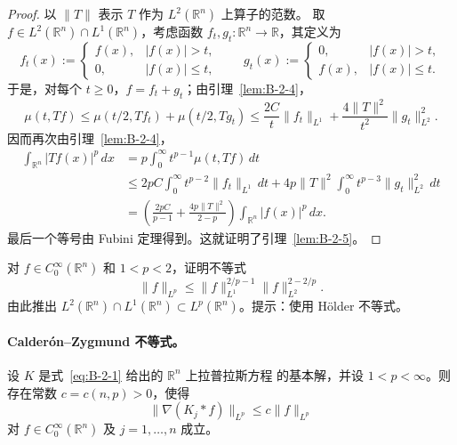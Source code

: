 \begin{proof}
以 $\|T\|$ 表示 $T$ 作为 $L^2(\mathbb R^n)$ 上算子的范数。
取 $f\in L^2(\mathbb R^n)\cap L^1(\mathbb R^n)$，考虑函数
$f_t,g_t:\mathbb R^n\to\mathbb R$，其定义为
\[
  f_t(x):=\begin{cases}
    f(x),&|f(x)|>t,\\ 0,&|f(x)|\le t,
  \end{cases}
  \qquad
  g_t(x):=\begin{cases}
    0,&|f(x)|>t,\\ f(x),&|f(x)|\le t.
  \end{cases}
\]
于是，对每个 $t\ge0$，$f=f_t+g_t$；由引理~\ref{lem:B-2-4}，
\[
  \mu(t,Tf)
  \le\mu(t/2,Tf_t)+\mu(t/2,Tg_t)
  \le\frac{2C}{t}\|f_t\|_{L^1}
     +\frac{4\|T\|^2}{t^2}\|g_t\|_{L^2}^2.
\]
因而再次由引理~\ref{lem:B-2-4}，
\begin{align*}
  \int_{\mathbb R^n}|Tf(x)|^p\,dx
  &=p\int_0^\infty t^{p-1}\mu(t,Tf)\,dt\\
  &\le2pC\int_0^\infty t^{p-2}\|f_t\|_{L^1}\,dt
   +4p\|T\|^2\int_0^\infty t^{p-3}\|g_t\|_{L^2}^2\,dt\\
  &=\left(\frac{2pC}{p-1}+\frac{4p\|T\|^2}{2-p}\right)
    \int_{\mathbb R^n}|f(x)|^p\,dx.
\end{align*}
最后一个等号由 Fubini 定理得到。这就证明了引理~\ref{lem:B-2-5}。
\end{proof}

\begin{exercise}\label{ex:B-2-6}
对 $f\in C_0^\infty(\mathbb R^n)$ 和 $1<p<2$，证明不等式
\[
  \|f\|_{L^p}
  \le\|f\|_{L^1}^{2/p-1}\|f\|_{L^2}^{2-2/p}.
\]
由此推出 $L^2(\mathbb R^n)\cap L^1(\mathbb R^n)
\subset L^p(\mathbb R^n)$。提示：使用 Hölder 不等式。
\end{exercise}

\paragraph{Calderón--Zygmund 不等式。}

\begin{theorem}\label{thm:B-2-7}
设 $K$ 是式~\eqref{eq:B-2-1} 给出的 $\mathbb R^n$ 上拉普拉斯方程
的基本解，并设 $1<p<\infty$。则存在常数 $c=c(n,p)>0$，使得
\begin{equation}\label{eq:B-2-3}
  \|\nabla(K_j*f)\|_{L^p}\le c\|f\|_{L^p}
\end{equation}
对 $f\in C_0^\infty(\mathbb R^n)$ 及 $j=1,\ldots,n$ 成立。
\end{theorem}

